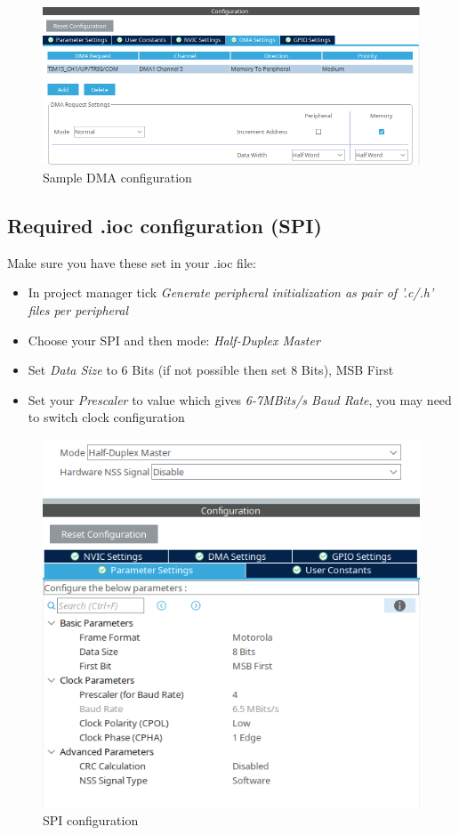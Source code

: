 \documentclass[]{article}
\begin{document}
	\begin{minipage}{0.5\textwidth}
		\begin{figure}[H]
			\centering
			\includegraphics[width=0.9\linewidth]{dma}
			\caption{Sample DMA configuration}
			\label{fig:dma}
		\end{figure}		
	\end{minipage}
	\subsection{Required .ioc configuration (SPI)}
	\begin{minipage}{0.5\textwidth}
	Make sure you have these set in your .ioc file:	
	\begin{itemize}
		\item In project manager tick \textit{Generate peripheral initialization as pair of '.c/.h' files per peripheral}
		\item Choose your SPI and then mode: \textit{Half-Duplex Master}
		\item Set \textit{Data Size} to 6 Bits (if not possible then set 8 Bits), MSB First
		\item Set your \textit{Prescaler} to value which gives \textit{6-7MBits/s Baud Rate}, you may need to switch clock configuration
	\end{itemize}	
	\end{minipage}
	\begin{minipage}{0.5\textwidth}
		\begin{figure}[H]
			\centering
			\includegraphics[width=0.8\linewidth]{SPI_config}
			\caption{SPI configuration}
			\label{fig:spiconfig}
		\end{figure}
	\end{minipage}	
\end{document}
